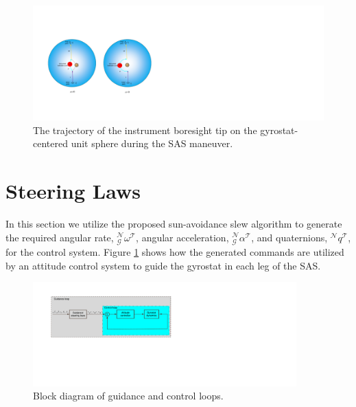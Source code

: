 \documentclass[letterpaper, paper,12pt]{AAS}		%
\begin{document}
	\begin{figure}[!h]
		\begin{center}
		\includegraphics[width=6in]{./Figures/SASSchematic3}
		\caption{The trajectory of the instrument boresight tip on the gyrostat-centered unit sphere during the SAS maneuver.}
		\end{center}
	\end{figure}
	
	
	\section{Steering Laws} 
	In this section we utilize the proposed sun-avoidance slew algorithm to generate the required angular rate, $_\mathcal{G}^\mathcal{N}\omega^\mathcal{T}$, angular acceleration, $_\mathcal{G}^\mathcal{N}\alpha^\mathcal{T}$, and quaternions, $^\mathcal{N}q^\mathcal{T}$, for the control system. Figure \ref{guidance_loop} shows how the generated commands are utilized by an attitude control system to guide the gyrostat in each leg of the SAS.
		\begin{figure}[H]
		\begin{center}
			\includegraphics[width=4in]{./Figures/guidance_loop}  
			\caption{Block diagram of guidance and control loops. }
			\label{guidance_loop}
		\end{center}    
	\end{figure}
	
\end{document}
